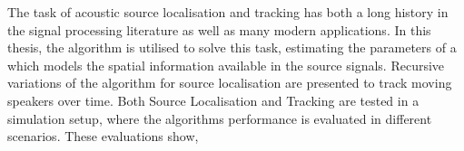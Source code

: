The task of acoustic source localisation and tracking has both a long history in the signal processing literature as well as many modern applications. In this thesis, the  algorithm is utilised to solve this task, estimating the parameters of a  which models the spatial information available in the source signals. Recursive variations of the algorithm for source localisation are presented to track moving speakers over time. Both Source Localisation and Tracking are tested in a simulation setup, where the algorithms performance is evaluated in different scenarios. These evaluations show, %
